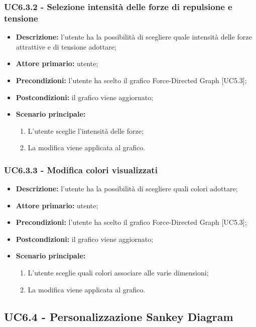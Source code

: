   \subsubsection{UC6.3.2 - Selezione intensità delle forze di repulsione e tensione}
  \begin{itemize}
    \item \textbf{Descrizione:} l'utente ha la possibilità di scegliere quale intensità delle forze attrattive e di tensione adottare;
    \item \textbf{Attore primario:} utente;
    \item \textbf{Precondizioni:} l’utente ha scelto il grafico Force-Directed Graph [UC5.3];
    \item \textbf{Postcondizioni:} il grafico viene aggiornato;
    \item \textbf{Scenario principale:} 
      \begin{enumerate}
      \item L'utente sceglie l'intensità delle forze;
      \item La modifica viene applicata al grafico.
    \end{enumerate}
  \end{itemize}

  \subsubsection{UC6.3.3 - Modifica colori visualizzati}
  \begin{itemize}
    \item \textbf{Descrizione:} l'utente ha la possibilità di scegliere quali colori adottare;
    \item \textbf{Attore primario:} utente;
    \item \textbf{Precondizioni:} l’utente ha scelto il grafico Force-Directed Graph [UC5.3];
    \item \textbf{Postcondizioni:} il grafico viene aggiornato;
    \item \textbf{Scenario principale:} 
     \begin{enumerate}
      \item L'utente sceglie quali colori associare alle varie dimensioni;
      \item La modifica viene applicata al grafico.
    \end{enumerate}
  \end{itemize}


\subsection{UC6.4 - Personalizzazione Sankey Diagram}


